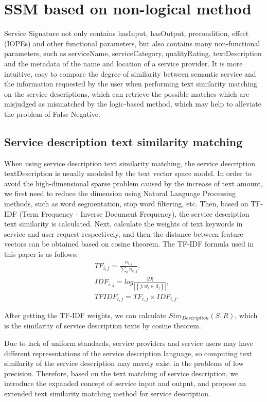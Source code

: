 \documentclass{ieeeaccess}
\begin{document}
\section{SSM based on non-logical method}
Service Signature not only contains hasInput, hasOutput, precondition, effect (IOPEs) and other functional parameters, but also contains many non-functional parameters, such as serviceName, serviceCategory, qualityRating, textDescription and the metadata of the name and location of a service provider. It is more intuitive, easy to compare the degree of similarity between semantic service and the information requested by the user when performing text similarity matching on the service descriptions, which can retrieve the possible matches which are misjudged as mismatched by the logic-based method, which may help to alleviate the problem of False Negative.

\subsection{Service description text similarity matching}
When using service description text similarity matching, the service description textDescription is usually modeled by the text vector space model. In order to avoid the high-dimensional sparse problem caused by the increase of text amount, we first need to reduce the dimension using Natural Language Processing methods, such as word segmentation, stop word filtering, etc. Then, based on TF-IDF (Term Frequency - Inverse Document Frequency), the service description text similarity is calculated. Next, calculate the weights of text keywords in service and user request respectively, and then the distance between feature vectors can be obtained based on cosine theorem. The TF-IDF formula used in this paper is as follows:
\begin{align}
&T{{F}_{i,j}}=\frac{{{n}_{i,j}}}{\mathop{\sum }_{k}{{n}_{k,j}}},\nonumber\\
&ID{{F}_{i,j}}=log\frac{\left| D \right|}{\left| \left\{ j:{{w}_{i}}\in {{d}_{j}} \right\} \right|},\nonumber\\
&TFID{{F}_{i,j}}=T{{F}_{i,j}}\times ID{{F}_{i,j}}.
\end{align}
 
After getting the TF-IDF weights, we can calculate $Si{{m}_{Description}}\left( S,R \right)$, which is the similarity of service description texts by cosine theorem.

Due to lack of uniform standards, service providers and service users may have different representations of the service description language, so computing text similarity of the service description may merely exist in the problems of low precision. Therefore, based on the text matching of service description, we introduce the expanded concept of service input and output, and propose an extended text similarity matching method for service description.
\end{document}
